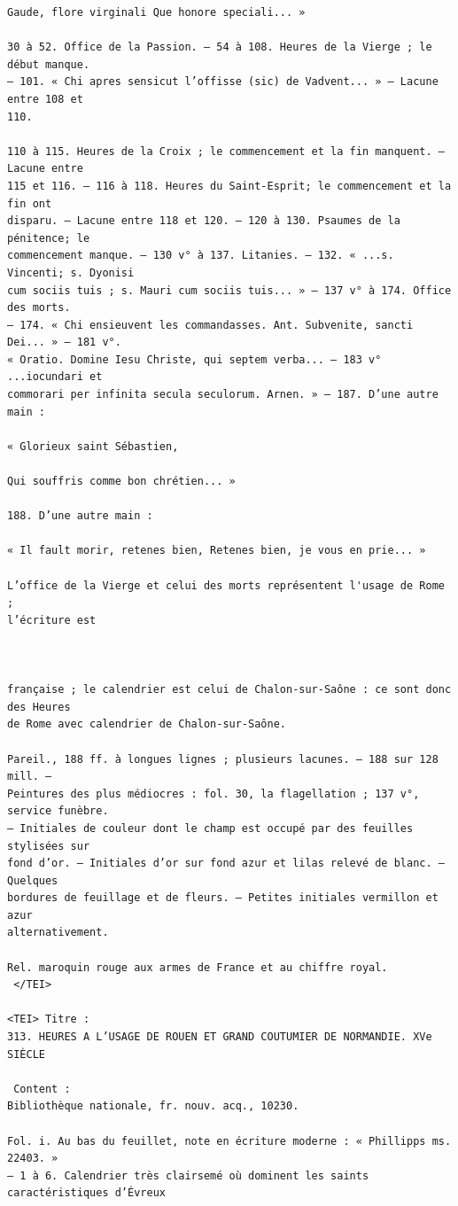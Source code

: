 \documentclass[a4paper,12pt,twoside]{book}
\begin{document}
\begin{verbatim}
Gaude, flore virginali Que honore speciali... »

30 à 52. Office de la Passion. — 54 à 108. Heures de la Vierge ; le début manque.
— 101. « Chi apres sensicut l’offisse (sic) de Vadvent... » — Lacune entre 108 et 
110.

110 à 115. Heures de la Croix ; le commencement et la fin manquent. — Lacune entre
115 et 116. — 116 à 118. Heures du Saint-Esprit; le commencement et la fin ont 
disparu. — Lacune entre 118 et 120. — 120 à 130. Psaumes de la pénitence; le 
commencement manque. — 130 v° à 137. Litanies. — 132. « ...s. Vincenti; s. Dyonisi
cum sociis tuis ; s. Mauri cum sociis tuis... » — 137 v° à 174. Office des morts.
— 174. « Chi ensieuvent les commandasses. Ant. Subvenite, sancti Dei... » — 181 v°.
« Oratio. Domine Iesu Christe, qui septem verba... — 183 v° ...iocundari et 
commorari per infinita secula seculorum. Arnen. » — 187. D’une autre main :

« Glorieux saint Sébastien,

Qui souffris comme bon chrétien... »

188. D’une autre main :

« Il fault morir, retenes bien, Retenes bien, je vous en prie... »

L’office de la Vierge et celui des morts représentent l'usage de Rome ; 
l’écriture est



française ; le calendrier est celui de Chalon-sur-Saône : ce sont donc des Heures
de Rome avec calendrier de Chalon-sur-Saône.

Pareil., 188 ff. à longues lignes ; plusieurs lacunes. — 188 sur 128 mill. — 
Peintures des plus médiocres : fol. 30, la flagellation ; 137 v°, service funèbre. 
— Initiales de couleur dont le champ est occupé par des feuilles stylisées sur 
fond d’or. — Initiales d’or sur fond azur et lilas relevé de blanc. — Quelques 
bordures de feuillage et de fleurs. — Petites initiales vermillon et azur 
alternativement.

Rel. maroquin rouge aux armes de France et au chiffre royal.
 </TEI> 

<TEI> Titre : 
313. HEURES A L’USAGE DE ROUEN ET GRAND COUTUMIER DE NORMANDIE. XVe SIÈCLE 
 
 Content : 
Bibliothèque nationale, fr. nouv. acq., 10230.

Fol. i. Au bas du feuillet, note en écriture moderne : « Phillipps ms. 22403. »
— 1 à 6. Calendrier très clairsemé où dominent les saints caractéristiques d’Évreux


\end{verbatim}
\end{document}

